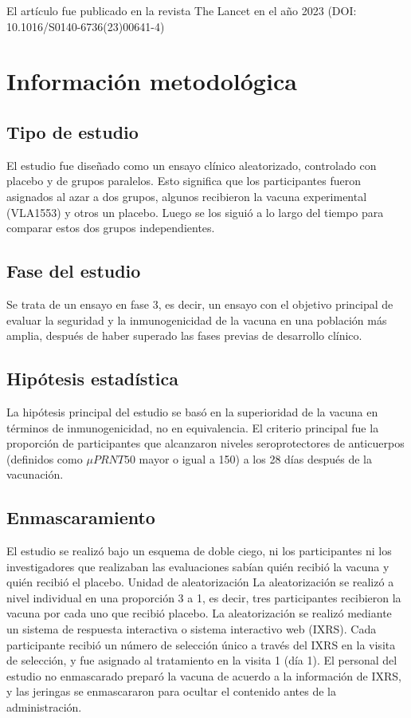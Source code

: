 \documentclass[
]{article}
\begin{document}
El artículo fue publicado en la revista The Lancet en el año 2023 (DOI:
10.1016/S0140-6736(23)00641-4)

\section{Información metodológica}\label{informaciuxf3n-metodoluxf3gica}

\subsection{Tipo de estudio}\label{tipo-de-estudio}

El estudio fue diseñado como un ensayo clínico aleatorizado, controlado
con placebo y de grupos paralelos. Esto significa que los participantes
fueron asignados al azar a dos grupos, algunos recibieron la vacuna
experimental (VLA1553) y otros un placebo. Luego se los siguió a lo
largo del tiempo para comparar estos dos grupos independientes.

\subsection{Fase del estudio}\label{fase-del-estudio}

Se trata de un ensayo en fase 3, es decir, un ensayo con el objetivo
principal de evaluar la seguridad y la inmunogenicidad de la vacuna en
una población más amplia, después de haber superado las fases previas de
desarrollo clínico.

\subsection{Hipótesis estadística}\label{hipuxf3tesis-estaduxedstica}

La hipótesis principal del estudio se basó en la superioridad de la
vacuna en términos de inmunogenicidad, no en equivalencia. El criterio
principal fue la proporción de participantes que alcanzaron niveles
seroprotectores de anticuerpos (definidos como \(\mu PRNT50\) mayor o
igual a 150) a los 28 días después de la vacunación.

\subsection{Enmascaramiento}\label{enmascaramiento}

El estudio se realizó bajo un esquema de doble ciego, ni los
participantes ni los investigadores que realizaban las evaluaciones
sabían quién recibió la vacuna y quién recibió el placebo. Unidad de
aleatorización La aleatorización se realizó a nivel individual en una
proporción 3 a 1, es decir, tres participantes recibieron la vacuna por
cada uno que recibió placebo. La aleatorización se realizó mediante un
sistema de respuesta interactiva o sistema interactivo web (IXRS). Cada
participante recibió un número de selección único a través del IXRS en
la visita de selección, y fue asignado al tratamiento en la visita 1
(día 1). El personal del estudio no enmascarado preparó la vacuna de
acuerdo a la información de IXRS, y las jeringas se enmascararon para
ocultar el contenido antes de la administración.
\end{document}
